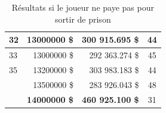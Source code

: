 \documentclass[letterpaper]{article}
\begin{document}
\begin{table}
\begin{tabular}{|l|r|r|c|}
	\cellcolor[HTML]{2E8B57} 32 & 13000000 \$ & 300 915.695 \$ & 44 \\ \hline
	\cellcolor[HTML]{2E8B57} 33 & 13000000 \$ & 292 363.274 \$ & 45 \\ \hline
	\cellcolor[HTML]{2E8B57} 35 & 13200000 \$ & 303 983.183 \$ & 44 \\ \hline
	\cellcolor[HTML]{483D8B} \textcolor{white}{38} & 13500000 \$ & 283 926.043 \$ & 48 \\ \hline
	\cellcolor[HTML]{483D8B} \textcolor{white}{40} & \textbf{14000000 \$} & \textbf{460 925.100 \$} & 31 \\ \hline
      \end{tabular}
      \caption{Résultats si le joueur ne paye pas pour sortir de prison}
      \label{table:result_tour_paye_pas}
    \end{table}
\end{document}
